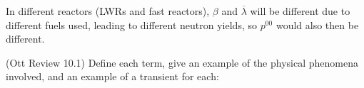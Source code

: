 \documentclass[11pt,addpoints,answers]{exam}
\begin{document}
\begin{questions}
\begin{solution}
            In different reactors (LWRs and fast reactors), $\beta$ and
            $\overline{\lambda}$ will be different due to different fuels used,
            leading to different neutron yields, so $p^{00}$ would also then
            be different.

        \end{solution}

        \question[15] (Ott Review 10.1) Define each term, give an example of the 
        physical phenomena involved, and an example of a transient for each: 
\end{questions}
\end{document}
